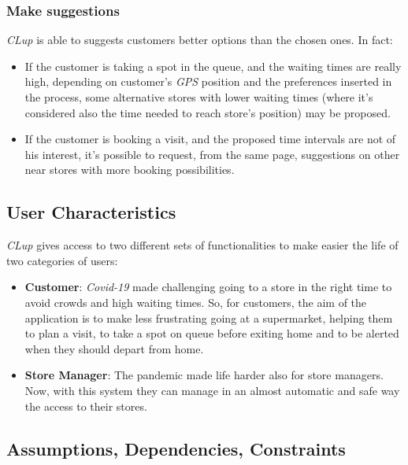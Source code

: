 \documentclass{article}
\begin{document}
		\subsubsection{Make suggestions}
		\emph{CLup} is able to suggests customers better options than the chosen ones.
		In fact:
		
		\bigskip
		\begin{itemize}
			\item If the customer is taking a spot in the queue, and the waiting times are really high, depending on customer's \emph{GPS} position and the preferences inserted in the process, some alternative stores with lower waiting times (where it's considered also the time needed to reach store's position) may be proposed.
			\item If the customer is booking a visit, and the proposed time intervals are not of his interest, it's possible to request, from the same page, suggestions on other near stores with more booking possibilities.
		\end{itemize}

	\bigskip
	
	\subsection{User Characteristics}
	
	\emph{CLup} gives access to two different sets of functionalities to make easier the life of two categories of users:
	
	\bigskip
	\begin{itemize}
		
		\item {\bfseries Customer}: \emph{Covid-19} made challenging going to a store in the right time to avoid crowds and high waiting times. So, for customers, the aim of the application is to make less frustrating going at a supermarket, helping them to plan a visit, to take a spot on queue before exiting home and to be alerted when they should depart from home. \\
		
		\item {\bfseries Store Manager}: The pandemic made life harder also for store managers. Now, with this system they can manage in an almost automatic and safe way the access to their stores. \\
		
	\end{itemize}

	\subsection{Assumptions, Dependencies, Constraints}
	
\end{document}
